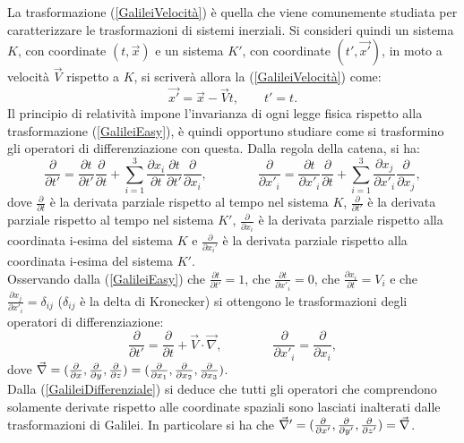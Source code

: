 La trasformazione (\ref{GalileiVelocità}) è quella che viene comunemente studiata per caratterizzare le trasformazioni di sistemi inerziali. 
Si consideri quindi un sistema $K$, con coordinate $(t,\vec{x})$ e un sistema $K'$, con 
coordinate $(t',\vec{x'})$, in moto a velocità $\vec{V}$ rispetto a $K$, si scriverà allora la 
(\ref{GalileiVelocità}) come:
\begin{equation}
	\vec{x'}=\vec{x}-\vec{V}t, \qquad t'=t.
	\label{GalileiEasy}
\end{equation}
Il principio di relatività impone l'invarianza di ogni legge fisica rispetto alla trasformazione (\ref{GalileiEasy}), è quindi opportuno
studiare come si trasformino gli operatori di differenziazione con questa.
Dalla regola della catena, si ha:
\begin{equation*}
		\frac{\partial}{\partial t'}=\frac{\partial t}{\partial t'}\frac{\partial}{\partial t}+
		\sum_{i=1}^{3}\frac{\partial x_i}{\partial t}\frac{\partial t}{\partial t'}
		\frac{\partial}{\partial x_i}, \qquad \qquad
		\frac{\partial}{\partial x'_i}=\frac{\partial t}{\partial x'_i}\frac{\partial}{\partial t}+
		\sum_{i=1}^{3}\frac{\partial x_j}{\partial x'_i}\frac{\partial}{\partial x_j},
\end{equation*}
dove $\frac{\partial}{\partial t}$ è la derivata parziale rispetto al tempo nel sistema $K$, $\frac{\partial}{\partial t'}$ è la derivata parziale rispetto al tempo nel sistema $K'$, $\frac{\partial}{\partial x_i}$ è la derivata parziale rispetto alla coordinata i-esima del sistema $K$ e $\frac{\partial}{\partial x_i'}$ è la derivata parziale rispetto alla coordinata i-esima del sistema $K'$.\\Osservando dalla (\ref{GalileiEasy}) che $\frac{\partial t}{\partial t'}=1$, che 
$\frac{\partial t}{\partial x'_i}=0$, che $\frac{\partial x_i}{\partial t}=V_i$ e che 
$\frac{\partial x_j}{\partial x'_i}=\delta_{ij}$ ($\delta_{ij}$ è la delta di Kronecker) 
si ottengono le trasformazioni degli operatori di differenziazione:
\begin{equation}
	\frac{\partial}{\partial t'}=\frac{\partial}{\partial t}+\vec{V}\cdot\vec{\nabla}, \qquad \qquad
	\frac{\partial}{\partial x'_i}=\frac{\partial}{\partial x_i},
	\label{GalileiDifferenziale}
\end{equation}
dove $\vec{\nabla}=(\frac{\partial }{\partial x},\frac{\partial }{\partial y},\frac{\partial }{\partial z})=(\frac{\partial }{\partial x_1},\frac{\partial }{\partial x_2},\frac{\partial }{\partial x_3})$.\\
Dalla (\ref{GalileiDifferenziale}) si deduce che tutti gli operatori che comprendono solamente derivate 
rispetto alle coordinate spaziali sono lasciati inalterati dalle trasformazioni di Galilei. In particolare si ha che $\vec{\nabla}'=(\frac{\partial }{\partial x'},\frac{\partial }{\partial y'},\frac{\partial }{\partial z'})=\vec{\nabla}$.\\

